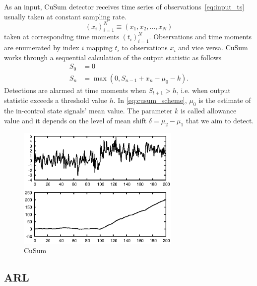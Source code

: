 \documentclass[doctoral,utf8,lot,loar,lof,shortloft,index]{jydiss}
\begin{document}
As an input, CuSum detector receives time series of observations~\ref{eq:input_ts} usually taken at constant sampling rate.
\begin{equation}\label{eq:input_ts}
	(x_i)_{i=1}^{N} \equiv (x_1, x_2, \dots, x_N)
\end{equation}
taken at corresponding time moments $(t_i)_{i=1}^N$.
Observations and time moments are enumerated by index $i$ mapping $t_i$ to observations $x_i$ and vice versa.
CuSum works through a sequential calculation of the output statistic as follows
\begin{align}
	S_0 &= 0 \nonumber \\
	S_{n} &= \max (0, S_{n-1} + x_n - \mu_0 - k )\label{eq:cusum_scheme}.
\end{align}
Detections are alarmed at time moments when $S_{t+1} > h$, i.e. when output statistic exceeds a threshold value $h$.
In \eqref{eq:cusum_scheme}, $\mu_0$ is the estimate of the in-control state signals' mean value.
The parameter $k$ is called allowance value and it depends on the level of mean shift $\delta=\mu_2-\mu_1$ that we aim to detect.



\begin{figure}[!htb]
	\centering
	\includegraphics[width=0.7\textwidth]{images/example_output_cusum.eps}
	\caption{CuSum}\label{fig:cusum_output_example}
\end{figure}

\subsection{ARL}
\end{document}
